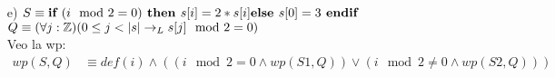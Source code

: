 \documentclass{article}
\begin{document}
{{\begin{itemize}
\begin{align}
        \equiv& (i \mod 3=0 \land 0\leq i<|s| \land_L s[i] \mod 3=0 )\lor\\\nonumber
        &(i \mod 3\neq0 \land0\leq i<|s| \land_L (\forall j:\ent)((0\leq j < |s|\land i\neq j)\to_L s[j] \mod 3 = 0)\land False)\\
        \equiv& (i \mod 3=0 \land 0\leq i<|s| \land_L s[i] \mod 3=0 )\lor False\\
        \equiv& (i \mod 3=0 \land 0\leq i<|s| \land_L s[i] \mod 3=0 )
    \end{align}
    \item [e) ] $S\equiv \textbf{if }(i \mod 2 =0)\textbf{ then } \\s[i]=2*s[i]\\ \textbf{else }\\s[0]=3\\ \textbf{ endif}$\\
    $Q\equiv (\forall j: \ent)(0\leq j<|s| \to_L s[j] \mod 2 =0)$\\
    \newpage 
    Veo la wp:\\
    \setcounter{equation}{0}\begin{align}
        wp(S,Q)&\equiv def(i) \land ((i \mod 2=0 \land wp(S1,Q))\lor(i \mod2\neq0 \land wp(S2,Q)))\\
    \end{align}


\end{itemize}}}
\end{document}
